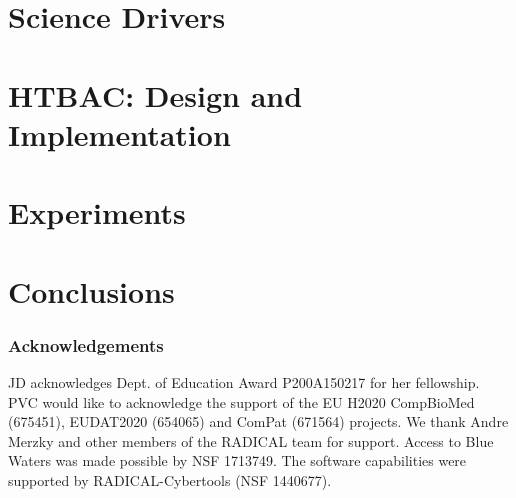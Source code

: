 \documentclass{llncs}
\begin{document}
\section{Science Drivers}
\label{sec:science-drivers}



\section{HTBAC: Design and Implementation}


\section{Experiments}


%

\section{Conclusions}


\subsubsection{Acknowledgements}
%

{\footnotesize JD acknowledges Dept. of Education Award P200A150217 for her fellowship. PVC
would like to acknowledge the support of the EU H2020 CompBioMed (675451),
EUDAT2020 (654065) and ComPat (671564) projects. We thank Andre Merzky and
other members of the RADICAL team for support. Access to Blue Waters was made
possible by NSF 1713749. The software capabilities were supported by
RADICAL-Cybertools (NSF 1440677).}

\newpage



\end{document}

